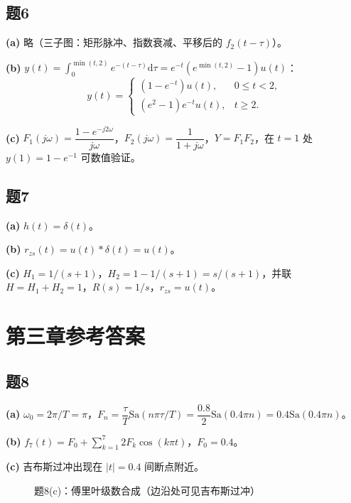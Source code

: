 \documentclass[11pt,a4paper]{ctexart}
\newcommand{\dd}{\mathrm{d}}
\newcommand{\Sa}{\mathrm{Sa}}
\newcommand{\dirac}{\delta}
\begin{document}
\subsection*{题6}

\textbf{(a)} 略（三子图：矩形脉冲、指数衰减、平移后的 $f_2(t-\tau)$）。

\textbf{(b)} $y(t)=\int_0^{\min(t,2)}e^{-(t-\tau)}\dd\tau=e^{-t}(e^{\min(t,2)}-1)u(t)$：
\[
y(t)=\begin{cases}(1-e^{-t})u(t),&0\le t<2,\\(e^2-1)e^{-t}u(t),&t\ge 2.\end{cases}
\]

\textbf{(c)} $F_1(j\omega)=\dfrac{1-e^{-j2\omega}}{j\omega}$，$F_2(j\omega)=\dfrac{1}{1+j\omega}$，$Y=F_1F_2$，在 $t=1$ 处 $y(1)=1-e^{-1}$ 可数值验证。

\subsection*{题7}

\textbf{(a)} $h(t)=\dirac(t)$。

\textbf{(b)} $r_{zs}(t)=u(t)*\dirac(t)=u(t)$。

\textbf{(c)} $H_1=1/(s+1)$，$H_2=1-1/(s+1)=s/(s+1)$，并联 $H=H_1+H_2=1$，$R(s)=1/s$，$r_{zs}=u(t)$。

\section{第三章参考答案}

\subsection*{题8}

\textbf{(a)} $\omega_0=2\pi/T=\pi$，$F_n=\dfrac{\tau}{T}\Sa(n\pi\tau/T)=\dfrac{0.8}{2}\Sa(0.4\pi n)=0.4\Sa(0.4\pi n)$。

\textbf{(b)} $f_7(t)=F_0+\sum_{k=1}^{7}2F_k\cos(k\pi t)$，$F_0=0.4$。

\textbf{(c)} 吉布斯过冲出现在 $|t|=0.4$ 间断点附近。

\begin{figure}[htbp]
\centering
{}
\caption{题8(c)：傅里叶级数合成（边沿处可见吉布斯过冲）}
\end{figure}
\end{document}
